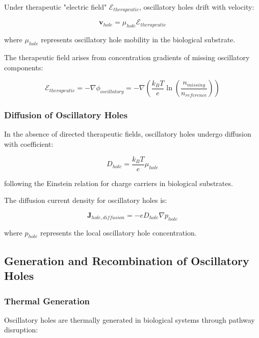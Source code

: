 Under therapeutic "electric field" $\mathcal{E}_{therapeutic}$, oscillatory holes drift with velocity:

\begin{equation}
\mathbf{v}_{hole} = \mu_{hole} \mathcal{E}_{therapeutic}
\end{equation}

where $\mu_{hole}$ represents oscillatory hole mobility in the biological substrate.

The therapeutic field arises from concentration gradients of missing oscillatory components:

\begin{equation}
\mathcal{E}_{therapeutic} = -\nabla \phi_{oscillatory} = -\nabla \left(\frac{k_B T}{e} \ln\left(\frac{n_{missing}}{n_{reference}}\right)\right)
\end{equation}

\subsubsection{Diffusion of Oscillatory Holes}

In the absence of directed therapeutic fields, oscillatory holes undergo diffusion with coefficient:

\begin{equation}
D_{hole} = \frac{k_B T}{e} \mu_{hole}
\end{equation}

following the Einstein relation for charge carriers in biological substrates.

The diffusion current density for oscillatory holes is:

\begin{equation}
\mathbf{J}_{hole,diffusion} = -e D_{hole} \nabla p_{hole}
\end{equation}

where $p_{hole}$ represents the local oscillatory hole concentration.

\subsection{Generation and Recombination of Oscillatory Holes}

\subsubsection{Thermal Generation}

Oscillatory holes are thermally generated in biological systems through pathway disruption:

